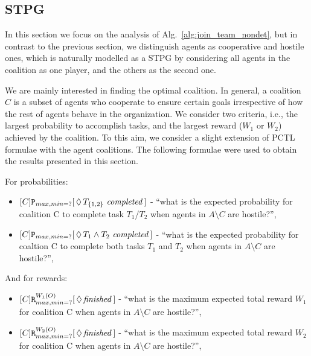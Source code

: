 \documentclass{llncs}
\begin{document}

\subsection{STPG}
\label{subsec:STPG}
In this section we focus on the analysis of Alg.~\ref{alg:join_team_nondet}, but in contrast to the previous section,
we distinguish agents as cooperative and hostile ones, which is naturally modelled as a STPG
by considering all agents in the coalition as one player, and the others as the second one.

We are mainly interested in finding the optimal coalition. In general,
a coalition $C$ is a subset of agents who cooperate to ensure certain goals irrespective of how the rest of agents behave in the organization. We consider two criteria,
i.e., the largest probability to accomplish tasks, and the largest reward ($W_1$ or $W_2$) achieved by the coalition. To this aim, we consider a slight extension of
PCTL formulae with the agent coalitions. The following formulae were used to obtain the results
presented in this section.

For probabilities:
\begin{itemize}
 \item $[C]{\tt P}_{max,min=?}[\,\Diamond\,T_{\{1,2\}} \mathit{\ completed}\,]$ -
``what is the expected probability for coalition C to complete task $T_1$/$T_2$ when agents in $A\setminus C$ are hostile?'',
 \item $[C]{\tt P}_{max,min=?}[\,\Diamond\,T_{1} \wedge T_2 \mathit{\ completed}\,]$ -
``what is the expected probability for coaltion C to complete both tasks $T_1$ and $T_2$ when agents in $A\setminus C$ are hostile?'',
\end{itemize}

And for rewards:
\begin{itemize}
 \item $[C]{\tt R}_{max,min=?}^{W_{1}(O)}[\,\Diamond\,\mathit{finished}\,]$ -
``what is the maximum expected total reward $W_1$ for coalition C when agents in $A\setminus C$ are hostile?'',
 \item $[C]{\tt R}_{max,min=?}^{W_{2}(O)}[\,\Diamond\,\mathit{finished}\,]$ -
``what is the maximum expected total reward $W_2$ for coalition C when agents in $A\setminus C$ are hostile?'',
\end{itemize}
\end{document}
